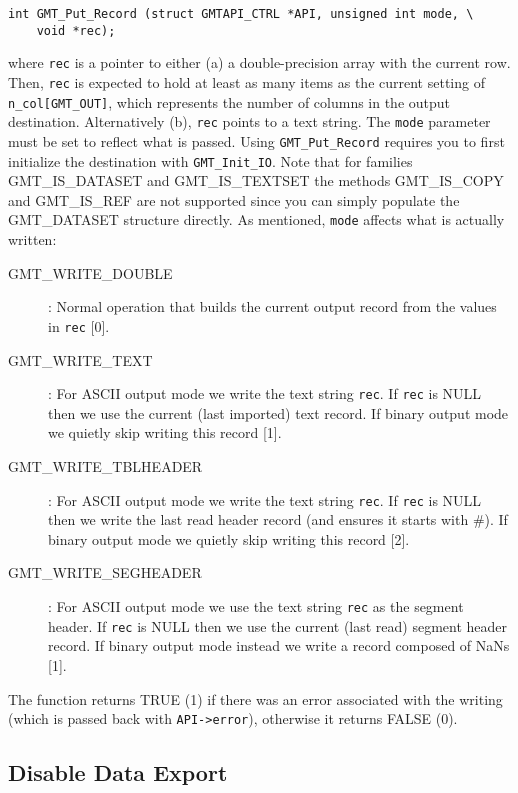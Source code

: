 \documentclass[11pt]{report}
\begin{document}
\begin{verbatim}
int GMT_Put_Record (struct GMTAPI_CTRL *API, unsigned int mode, \
    void *rec);
\end{verbatim}
where \texttt{rec} is a pointer to either (a) a double-precision array with the current row.
Then, \texttt{rec} is expected to hold at least as many items as the current setting of
\texttt{n\_col[GMT\_OUT]}, which represents the number of columns in the output destination.
Alternatively (b), \texttt{rec} points to a text string.
The \texttt{mode} parameter must be set to reflect what is passed.  Using \texttt{GMT\_Put\_Record}
requires you to first initialize the destination with \texttt{GMT\_Init\_IO}.
Note that for families GMT\_IS\_DATASET and GMT\_IS\_TEXTSET the methods GMT\_IS\_COPY and GMT\_IS\_REF are not supported since
you can simply populate the GMT\_DATASET structure directly.
As mentioned, \texttt{mode} affects what is actually written:
\begin{description}
\item [GMT\_WRITE\_DOUBLE]: Normal operation that builds the current output record from
the values in \texttt{rec} [0].
\item [GMT\_WRITE\_TEXT]: For ASCII output mode we write the text string \texttt{rec}.
If \texttt{rec} is NULL then we use the current (last imported) text record.
If binary output mode we quietly skip writing this record [1].
\item [GMT\_WRITE\_TBLHEADER]: For ASCII output mode we write the text string \texttt{rec}.
If \texttt{rec} is NULL then we write the last read
header record (and ensures it starts with \#). If binary output mode we quietly skip writing this record [2].
\index{GMT\_WRITE\_TBLHEADER}
\item [GMT\_WRITE\_SEGHEADER]: For ASCII output mode we use the text string \texttt{rec} as the segment header.
If \texttt{rec} is NULL then we use the current (last read) segment header record.
If binary output mode instead we write a record composed of NaNs [1].
\index{GMT\_WRITE\_SEGHEADER}
\end{description}
The function returns TRUE (1) if there was an error associated with the writing (which is passed back with \texttt{API->error}),
otherwise it returns FALSE (0).

\subsection{Disable Data Export}
\end{document}
